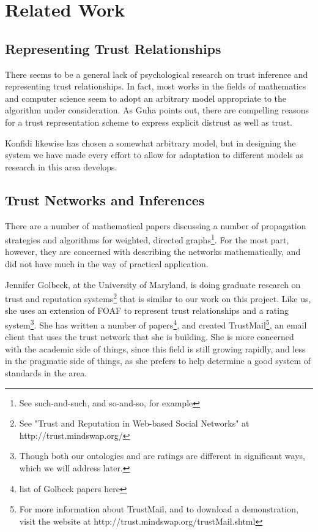\documentclass{acm_proc_article-sp}
\begin{document}
\section{Related Work}

\subsection{Representing Trust Relationships}
There seems to be a general lack of psychological research on trust inference and representing trust relationships. In fact, most works in the fields of mathematics and computer science seem to adopt an arbitrary model appropriate to the algorithm under consideration. As Guha points out\cite{guha04propagation}, there are compelling reasons for a trust representation scheme to express explicit distrust as well as trust.

Konfidi likewise has chosen a somewhat arbitrary model, but in designing the system we have made every effort to allow for adaptation to different models as research in this area develops. 

\subsection{Trust Networks and Inferences}
There are a number of mathematical papers discussing a number of propagation strategies and algorithms for weighted, directed graphs\footnote{See such-and-such, and so-and-so, for example}.  For the most part, however, they are concerned with describing the networks mathematically, and did not have much in the way of practical application. 

Jennifer Golbeck, at the University of Maryland, is doing graduate research on trust and reputation systems\footnote{See "Trust and Reputation in Web-based Social Networks" at http://trust.mindswap.org/} that is similar to our work on this project.  Like us, she uses an extension of FOAF to represent trust relationships and a rating system\footnote{Though both our ontologies and are ratings are different in significant ways, which we will address later.}.  She has written a number of papers\footnote{list of Golbeck papers here}, and created TrustMail\footnote{For more information about TrustMail, and to download a demonstration, visit the website at http://trust.mindswap.org/trustMail.shtml}, an email client that uses the trust network that she is building.  She is more concerned with the academic side of things, since this field is still growing rapidly, and less in the pragmatic side of things, as she prefers to help determine a good system of standards in the area.
\end{document}
